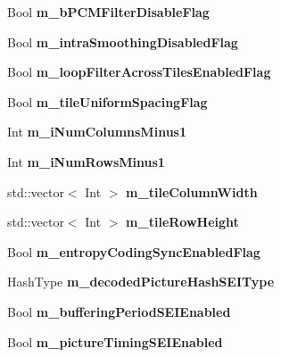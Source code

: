 \begin{DoxyCompactItemize}
Bool {\bfseries m\+\_\+b\+P\+C\+M\+Filter\+Disable\+Flag}
\item 
\mbox{\label{class_t_enc_cfg_a858e975fc6741c34ed4c8dbbd4276e71}} 
Bool {\bfseries m\+\_\+intra\+Smoothing\+Disabled\+Flag}
\item 
\mbox{\label{class_t_enc_cfg_a588b9a672ac375247daecb2a80706f8e}} 
Bool {\bfseries m\+\_\+loop\+Filter\+Across\+Tiles\+Enabled\+Flag}
\item 
\mbox{\label{class_t_enc_cfg_a5fbba20a6078c3ca6d86e0f8064eeaed}} 
Bool {\bfseries m\+\_\+tile\+Uniform\+Spacing\+Flag}
\item 
\mbox{\label{class_t_enc_cfg_a9ba77e38a6a6ccb129a2902eb968dc99}} 
Int {\bfseries m\+\_\+i\+Num\+Columns\+Minus1}
\item 
\mbox{\label{class_t_enc_cfg_a0a3e4af187769ec978f7ba1d969524ea}} 
Int {\bfseries m\+\_\+i\+Num\+Rows\+Minus1}
\item 
\mbox{\label{class_t_enc_cfg_a9ec9a17d34164982b3d6e664bc4a411c}} 
std\+::vector$<$ Int $>$ {\bfseries m\+\_\+tile\+Column\+Width}
\item 
\mbox{\label{class_t_enc_cfg_a3531eae34cd8ed027f1521071cbef02a}} 
std\+::vector$<$ Int $>$ {\bfseries m\+\_\+tile\+Row\+Height}
\item 
\mbox{\label{class_t_enc_cfg_a44285e0f6f2b0cd01657f1f7f0e9b7cd}} 
Bool {\bfseries m\+\_\+entropy\+Coding\+Sync\+Enabled\+Flag}
\item 
\mbox{\label{class_t_enc_cfg_a341fb2d5708753d7b13d77bfbf5bfd56}} 
Hash\+Type {\bfseries m\+\_\+decoded\+Picture\+Hash\+S\+E\+I\+Type}
\item 
\mbox{\label{class_t_enc_cfg_a462860b80e809f31a625f4c22e88aeca}} 
Bool {\bfseries m\+\_\+buffering\+Period\+S\+E\+I\+Enabled}
\item 
\mbox{\label{class_t_enc_cfg_a578d3e0ddd26ecf78657c01a6a113719}} 
Bool {\bfseries m\+\_\+picture\+Timing\+S\+E\+I\+Enabled}

\end{DoxyCompactItemize}
